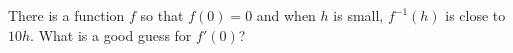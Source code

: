 \documentclass{ximera}
\begin{document}
\begin{problem}
  There is a function $f$ so that $f(0) = 0$ and when $h$ is small, $f^{-1}(h)$ is close to $10 h$.  What is a good guess for $f'(0)$?
  \begin{multipleChoice}
  \end{multipleChoice}
\end{problem}
\end{document}
